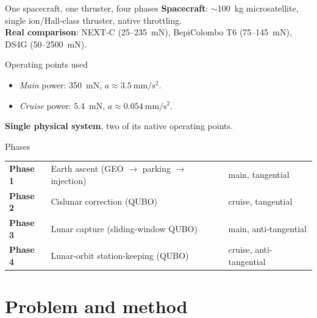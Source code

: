 \documentclass[10pt,aspectratio=169]{beamer}
\begin{document}
\begin{frame}{One spacecraft, one thruster, four phases}
\textbf{Spacecraft}: $\sim$\SI{100}{\kg} microsatellite,
single ion/Hall-class thruster, native throttling.\\
\textbf{Real comparison}: NEXT-C (25--\SI{235}{\milli\newton}),
BepiColombo T6 (75--\SI{145}{\milli\newton}),
DS4G (50--\SI{2500}{\milli\newton}).
\medskip

\begin{block}{Operating points used}
\begin{itemize}[itemsep=2pt]
  \item \emph{Main} power: \SI{350}{\milli\newton},
    $a \approx \SI{3.5}{\milli\meter\per\second\squared}$.
  \item \emph{Cruise} power: \SI{5.4}{\milli\newton},
    $a \approx \SI{0.054}{\milli\meter\per\second\squared}$.
\end{itemize}
\textbf{Single physical system}, two of its native operating points.
\end{block}

\begin{block}{Phases}
\begin{tabular}{lll}
\textbf{Phase 1} & Earth ascent (GEO $\to$ parking $\to$ injection)
   & main, tangential \\
\textbf{Phase 2} & Cislunar correction (QUBO)
   & cruise, tangential \\
\textbf{Phase 3} & Lunar capture (sliding-window QUBO)
   & main, anti-tangential \\
\textbf{Phase 4} & Lunar-orbit station-keeping (QUBO)
   & cruise, anti-tangential \\
\end{tabular}
\end{block}
\end{frame}

\section{Problem and method}
\end{document}
